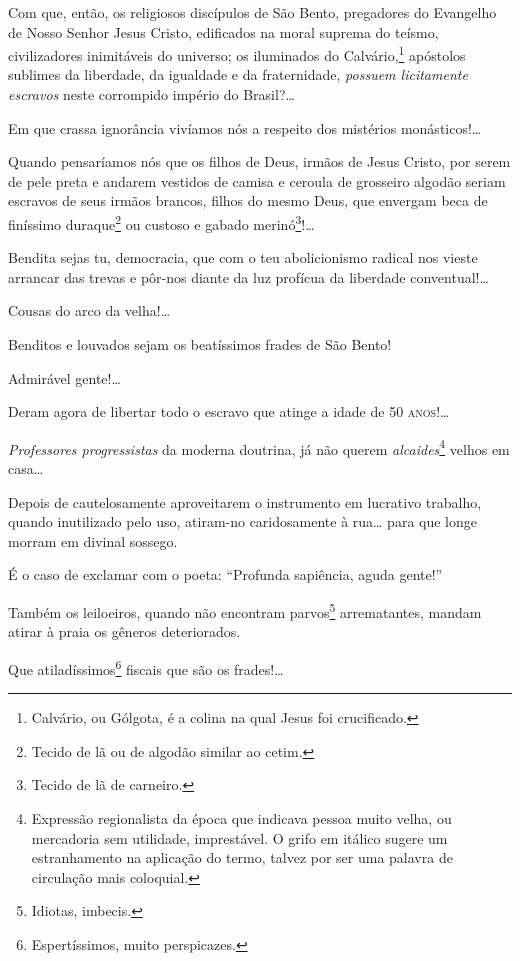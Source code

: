 Com que, então, os religiosos discípulos de São Bento, pregadores do
Evangelho de Nosso Senhor Jesus Cristo, edificados na moral suprema do
teísmo, civilizadores inimitáveis do universo; os iluminados do
Calvário,\footnote{ Calvário, ou Gólgota, é a colina na qual Jesus foi
  crucificado.} apóstolos sublimes da liberdade, da igualdade e da
fraternidade, \emph{possuem licitamente escravos} neste corrompido
império do Brasil?\ldots{}

Em que crassa ignorância vivíamos nós a respeito dos mistérios
monásticos!\ldots{}

Quando pensaríamos nós que os filhos de Deus, irmãos de Jesus Cristo,
por serem de pele preta e andarem vestidos de camisa e ceroula de
grosseiro algodão seriam escravos de seus irmãos brancos, filhos do
mesmo Deus, que envergam beca de finíssimo duraque\footnote{ Tecido de
  lã ou de algodão similar ao cetim.} ou custoso e gabado
merinó\footnote{ Tecido de lã de carneiro.}!\ldots{}

Bendita sejas tu, democracia, que com o teu abolicionismo radical nos
vieste arrancar das trevas e pôr-nos diante da luz profícua da liberdade
conventual!\ldots{}

Cousas do arco da velha!\ldots{}

Benditos e louvados sejam os beatíssimos frades de São Bento!

Admirável gente!\ldots{}

Deram agora de libertar todo o escravo que atinge a idade de 50 \textsc{anos}!\ldots{}

\emph{Professores progressistas} da moderna doutrina, já não querem
\emph{alcaides}\footnote{ Expressão regionalista da época que indicava
  pessoa muito velha, ou mercadoria sem utilidade, imprestável. O grifo
  em itálico sugere um estranhamento na aplicação do termo, talvez por
  ser uma palavra de circulação mais coloquial.} velhos em casa\ldots{}

Depois de cautelosamente aproveitarem o instrumento em lucrativo
trabalho, quando inutilizado pelo uso, atiram-no caridosamente à rua\ldots{}
para que longe morram em divinal sossego.

É o caso de exclamar com o poeta: ``Profunda sapiência, aguda gente!''

Também os leiloeiros, quando não encontram parvos\footnote{ Idiotas,
  imbecis.} arrematantes, mandam atirar à praia os gêneros deteriorados.

Que atiladíssimos\footnote{ Espertíssimos, muito perspicazes.} fiscais
que são os frades!\ldots{}

